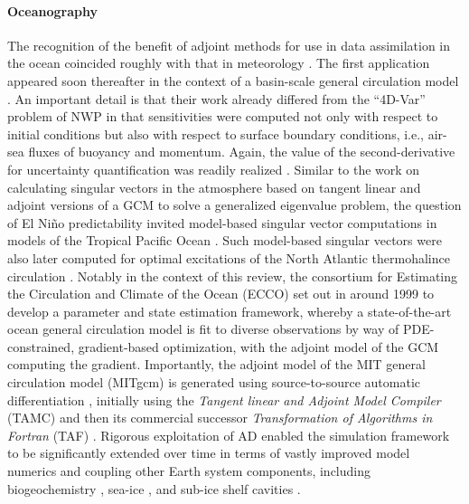 \paragraph{Oceanography}

The recognition of the benefit of adjoint methods for use in data assimilation in the ocean coincided roughly with that in meteorology \cite{Thacker:1988kp,Thacker:1988ed}. 
The first application appeared soon thereafter in the context of a basin-scale general circulation model \cite{Tziperman.1989,Tziperman:1992hg,Tziperman:1992jw}. 
An important detail is that their work already differed from the ``4D-Var'' problem of NWP in that sensitivities were computed not only with respect to initial conditions but also with respect to surface boundary conditions, i.e., air-sea fluxes of buoyancy and momentum.
Again, the value of the second-derivative for uncertainty quantification was readily realized \cite{Thacker:1989jf}.
Similar to the work on calculating singular vectors in the atmosphere based on tangent linear and adjoint versions of a GCM to solve a generalized eigenvalue problem, the question of El Ni\~no predictability invited model-based singular vector computations in models of the Tropical Pacific Ocean \cite{Moore:1997ci,Moore:1997fp}.
Such model-based singular vectors were also later computed for optimal excitations of the North Atlantic thermohalince circulation \cite{Zanna.2010,Zanna:2011ge,Zanna:2012dw}.
Notably in the context of this review, the consortium for Estimating the Circulation and Climate of the Ocean (ECCO) \cite{Stammer.2002} set out in around 1999 to develop a parameter and state estimation framework, whereby a state-of-the-art ocean general circulation model is fit to diverse observations by way of PDE-constrained, gradient-based optimization, with the adjoint model of the GCM computing the gradient.
Importantly, the adjoint model of the MIT general circulation model (MITgcm) is generated using source-to-source automatic differentiation \cite{Marotzke:1999wc,Heimbach.2005}, initially using the \textit{Tangent linear and Adjoint Model Compiler} (TAMC)\cite{Giering:1998in} and then its commercial successor \textit{Transformation of Algorithms in Fortran} (TAF) \cite{Giering.2006}.
Rigorous exploitation of AD enabled the simulation framework to be significantly extended over time in terms of vastly improved model numerics \cite{Forget.2015m9i} and coupling other Earth system components, including biogeochemistry \cite{Dutkiewicz:2006gw}, sea-ice \cite{Heimbach:2010fz}, and sub-ice shelf cavities \cite{Heimbach:2012iu}.
